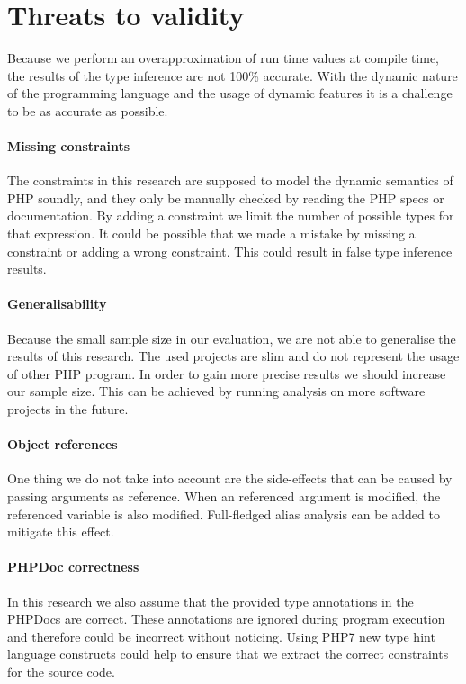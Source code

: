 \documentclass[main.tex]{subfiles}
\begin{document}
    \section{Threats to validity}\label{conclusion:threats-to-validity}	
    Because we perform an overapproximation of run time values at compile time, the results of the type inference are not 100\% accurate.
    With the dynamic nature of the programming language and the usage of dynamic features it is a challenge to be as accurate as possible.
		
	\paragraph{Missing constraints}
	The constraints in this research are supposed to model the dynamic semantics of PHP soundly, and they only be manually checked by reading the PHP specs or documentation\footnotemark{}.
	By adding a constraint we limit the number of possible types for that expression.
	It could be possible that we made a mistake by missing a constraint or adding a wrong constraint.
	This could result in false type inference results.
	
	\paragraph{Generalisability}
	Because the small sample size in our evaluation, we are not able to generalise the results of this research.
	The used projects are slim and do not represent the usage of other PHP program.
	In order to gain more precise results we should increase our sample size.
	This can be achieved by running analysis on more software projects in the future.
	
	\paragraph{Object references}
	One thing we do not take into account are the side-effects that can be caused by passing arguments as reference.
	When an referenced argument is modified, the referenced variable is also modified.
	Full-fledged alias analysis can be added to mitigate this effect.
	
	\paragraph{PHPDoc correctness}
	In this research we also assume that the provided type annotations in the PHPDocs are correct.
	These annotations are ignored during program execution and therefore could be incorrect without noticing.
	Using PHP7 new type hint language constructs could help to ensure that we extract the correct constraints for the source code.

	
\end{document}
